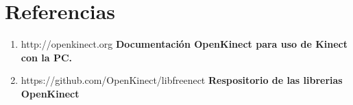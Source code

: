 \documentclass[letterpaper]{article}
\begin{document}
\section{Referencias}

\begin{enumerate}
\item http://openkinect.org \textbf{Documentación OpenKinect para uso de Kinect con la PC.}
\item https://github.com/OpenKinect/libfreenect \textbf{Respositorio de las librerias OpenKinect}
\end{enumerate}
	
\end{document}
